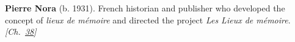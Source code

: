 \textbf{Pierre Nora} (b. 1931). French historian and publisher who developed the concept of \emph{lieux de m\'{e}moire} and directed the project \emph{Les Lieux de m\'{e}moire}. \emph{[Ch.~\hyperref[ch:christmastruce1914]{38}]}

